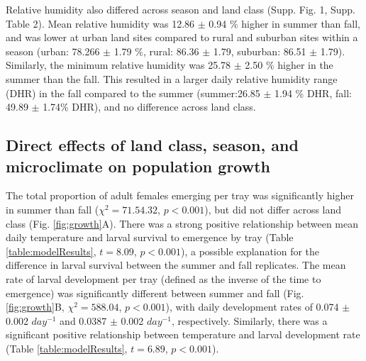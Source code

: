 \documentclass[12pt]{article}
\begin{document}
Relative humidity also differed across season and land class (Supp. Fig. 1, Supp. Table 2). Mean relative humidity was 12.86 $\pm$ 0.94 \% higher in summer than fall, and was lower at urban land sites compared to rural and suburban sites within a season (urban: 78.266 $\pm$ 1.79 \%, rural: 86.36 $\pm$ 1.79, suburban: 86.51 $\pm$ 1.79). Similarly, the minimum relative humidity was 25.78 $\pm$ 2.50 \% higher in the summer than the fall. This resulted in a larger daily relative humidity range (DHR) in the fall compared to the summer (summer:26.85 $\pm$ 1.94 \% DHR, fall: 49.89 $\pm$ 1.74\% DHR), and no difference across land class.

\subsection{Direct effects of land class, season, and microclimate on population growth}

The total proportion of adult females emerging per tray was significantly higher in summer than fall ($\chi^2=71.54.32$, $p<0.001$), but did not differ across land class (Fig. \ref{fig:growth}A). There was a strong positive relationship between mean daily temperature and larval survival to emergence by tray (Table \ref{table:modelResults}, $t=8.09$, $p<0.001$), a possible explanation for the difference in larval survival between the summer and fall replicates. The mean rate of larval development per tray (defined as the inverse of the time to emergence) was significantly different between summer and fall (Fig. \ref{fig:growth}B, $\chi^2=588.04$, $p<0.001$), with daily development rates of 0.074 $\pm$ 0.002 $day^{-1}$ and 0.0387 $\pm$ 0.002 $day^{-1}$, respectively. Similarly, there was a significant positive relationship between temperature and larval development rate (Table \ref{table:modelResults}, $t=6.89$, $p<0.001$). 
\end{document}
